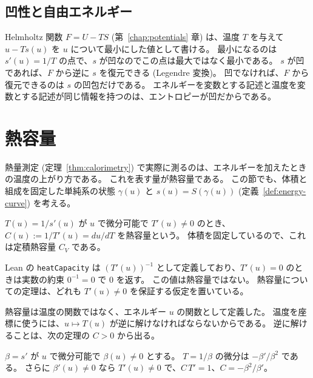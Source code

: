 \subsection{凹性と自由エネルギー}

Helmholtz 関数 $F = U - TS$ (第~\ref{chap:potentials} 章) は、温度 $T$ を与えて $u - T s(u)$ を $u$ について最小にした値として書ける。
最小になるのは $s'(u) = 1/T$ の点で、$s$ が凹なのでこの点は最大ではなく最小である。
$s$ が凹であれば、$F$ から逆に $s$ を復元できる (Legendre 変換)。
凹でなければ、$F$ から復元できるのは $s$ の凹包だけである。
エネルギーを変数とする記述と温度を変数とする記述が同じ情報を持つのは、エントロピーが凹だからである。

\section{熱容量}
\label{sec:heat-capacity}

熱量測定 (定理~\ref{thm:calorimetry}) で実際に測るのは、エネルギーを加えたときの温度の上がり方である。
これを表す量が熱容量である。
この節でも、体積と組成を固定した単純系の状態 $\gamma(u)$ と $s(u) = S(\gamma(u))$ (定義~\ref{def:energy-curve}) を考える。

\begin{definition}[熱容量]
  \label{def:heat-capacity}
  \leanok
  $T(u) = 1/s'(u)$ が $u$ で微分可能で $T'(u) \ne 0$ のとき、$C(u) := 1/T'(u) = du/dT$ を熱容量という。
  体積を固定しているので、これは定積熱容量 $C_V$ である。
\end{definition}

Lean の \texttt{heatCapacity} は $(T'(u))^{-1}$ として定義しており、$T'(u) = 0$ のときは実数の約束 $0^{-1} = 0$ で $0$ を返す。
この値は熱容量ではない。
熱容量についての定理は、どれも $T'(u) \ne 0$ を保証する仮定を置いている。

熱容量は温度の関数ではなく、エネルギー $u$ の関数として定義した。
温度を座標に使うには、$u \mapsto T(u)$ が逆に解けなければならないからである。
逆に解けることは、次の定理の $C > 0$ から出る。

\begin{theorem}[熱容量とエントロピーの二階微分]
  \label{thm:heat-capacity-eq}
  \leanok
  $\beta = s'$ が $u$ で微分可能で $\beta(u) \ne 0$ とする。
  $T = 1/\beta$ の微分は $-\beta'/\beta^2$ である。
  さらに $\beta'(u) \ne 0$ なら $T'(u) \ne 0$ で、$C\, T' = 1$、$C = -\beta^2/\beta'$。
\end{theorem}

